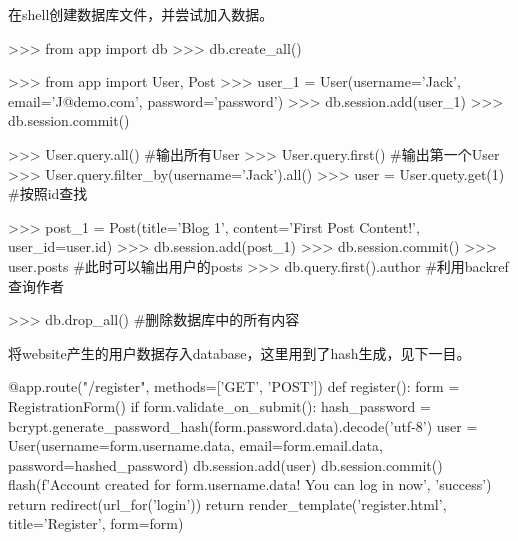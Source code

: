       在shell创建数据库文件，并尝试加入数据。
      \begin{codeblock}[language=python, caption={create database file in terminal}]
        >>> from app import db
        >>> db.create_all()

        >>> from app import User, Post
        >>> user_1 = User(username='Jack', email='J@demo.com', password='password')
        >>> db.session.add(user_1)
        >>> db.session.commit()

        >>> User.query.all() #输出所有User
        >>> User.query.first() #输出第一个User
        >>> User.query.filter_by(username='Jack').all()
        >>> user = User.quety.get(1) #按照id查找

        >>> post_1 = Post(title='Blog 1', content='First Post Content!', user_id=user.id)
        >>> db.session.add(post_1)
        >>> db.session.commit()
        >>> user.posts #此时可以输出用户的posts
        >>> db.query.first().author #利用backref查询作者

        >>> db.drop_all() #删除数据库中的所有内容
      \end{codeblock}

      将website产生的用户数据存入database，这里用到了hash生成，见下一目。
      \begin{codeblock}
        @app.route("/register", methods=['GET', 'POST']) 
        def register():
            form = RegistrationForm()
            if form.validate_on_submit(): 
                hash_password = bcrypt.generate_password_hash(form.password.data).decode('utf-8')
                user = User(username=form.username.data, 
                            email=form.email.data, 
                            password=hashed_password)
                db.session.add(user)
                db.session.commit()
                flash(f'Account created for {form.username.data}! You can log in now', 'success') 
                return redirect(url_for('login'))
            return render_template('register.html', title='Register', form=form)
      \end{codeblock}

